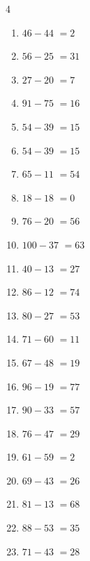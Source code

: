 \begin{multicols}{4}
\begin{enumerate}
  \item $46-44$
        $=2$

  \item $56-25$
        $=31$

  \item $27-20$
        $=7$

  \item $91-75$
        $=16$

  \item $54-39$
        $=15$

  \item $54-39$
        $=15$

  \item $65-11$
        $=54$

  \item $18-18$
        $=0$

  \item $76-20$
        $=56$

  \item $100-37$
        $=63$

  \item $40-13$
        $=27$

  \item $86-12$
        $=74$

  \item $80-27$
        $=53$

  \item $71-60$
        $=11$

  \item $67-48$
        $=19$

  \item $96-19$
        $=77$

  \item $90-33$
        $=57$

  \item $76-47$
        $=29$

  \item $61-59$
        $=2$

\columnbreak %

\resetques

  \item $69-43$
        $=26$

  \item $81-13$
        $=68$

  \item $88-53$
        $=35$

  \item $71-43$
        $=28$


\end{enumerate}
\end{multicols}
